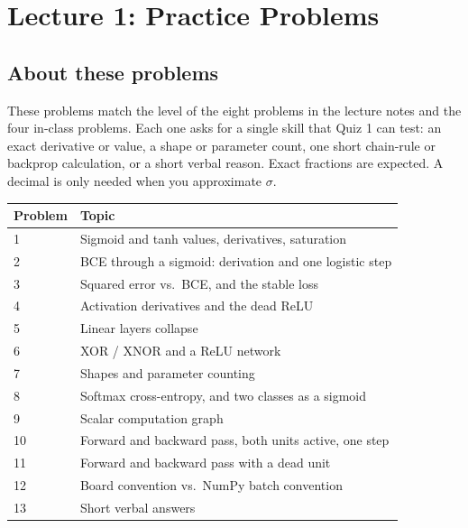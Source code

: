 \section{Lecture 1: Practice Problems}

\subsection*{About these problems}

These problems match the level of the eight problems in the lecture notes and the four in-class problems. Each one asks for a single skill that Quiz 1 can test: an exact derivative or value, a shape or parameter count, one short chain-rule or backprop calculation, or a short verbal reason. Exact fractions are expected. A decimal is only needed when you approximate $\sigma$.

\begin{center}
\begin{tabular}{@{}l p{}@{}}
\toprule
Problem & Topic \\
\midrule
1 & Sigmoid and tanh values, derivatives, saturation \\
2 & BCE through a sigmoid: derivation and one logistic step \\
3 & Squared error vs.\ BCE, and the stable loss \\
4 & Activation derivatives and the dead ReLU \\
5 & Linear layers collapse \\
6 & XOR / XNOR and a ReLU network \\
7 & Shapes and parameter counting \\
8 & Softmax cross-entropy, and two classes as a sigmoid \\
9 & Scalar computation graph \\
10 & Forward and backward pass, both units active, one step \\
11 & Forward and backward pass with a dead unit \\
12 & Board convention vs.\ NumPy batch convention \\
13 & Short verbal answers \\
\bottomrule
\end{tabular}
\end{center}

\newpage

